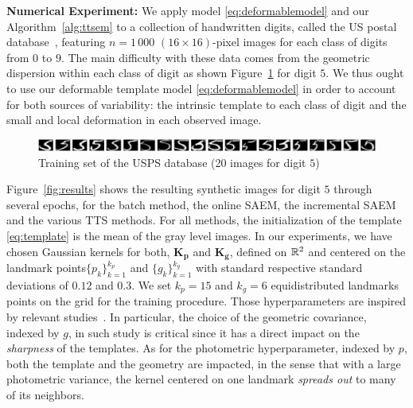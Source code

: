 \documentclass[11pt]{article}
\theoremstyle{t}
\begin{document}
\textbf{Numerical Experiment:} We apply model \eqref{eq:deformablemodel} and our Algorithm~\ref{alg:ttsem} to a collection of handwritten digits, called the US postal database~\citep{hull1994database}, featuring $n = 1\, 000$ $(16 \times 16)$-pixel images for each class of digits from $0$ to $9$.
The main difficulty with these data comes from the geometric dispersion within each class of digit as shown Figure~\ref{fig:variancedigit} for digit $5$.
We thus ought to use our deformable template model \eqref{eq:deformablemodel} in order to account for both sources of variability: the intrinsic template to each class of digit and the small and local deformation in each observed image.
\begin{figure}[H]
\includegraphics[width=\textwidth]{pic_paper/variancedigit.png}\vspace{-.2cm}
\caption{Training set of the USPS database (20 images for digit $5$)}\vspace{-.2cm}
\label{fig:variancedigit}
\end{figure}\vspace{-0.2cm}

Figure~\ref{fig:results} shows the resulting synthetic images for digit $5$ through several epochs, for the batch method, the online SAEM, the incremental SAEM and the various TTS methods.
For all methods, the initialization of the template \eqref{eq:template} is the mean of the gray level images.
In our experiments, we have chosen Gaussian kernels for both, $\mathbf{K}_{\mathbf{p}}$ and $\mathbf{K}_{\mathbf{g}}$, defined on $\rset^2$ and centered on the landmark points$\{p_k\}_{k=1}^{k_p}$ and $\{g_k\}_{k=1}^{k_g}$ with standard respective standard deviations of $0.12$ and $0.3$. 
We set $k_p = 15$  and  $k_g = 6$ equidistributed landmarks points on the grid for the training procedure. 
Those hyperparameters are inspired by relevant studies~\citep{allassonniere2008stochastic,allassonniere2010construction}.
In particular, the choice of the geometric covariance, indexed by $g$, in such study is critical since it has a direct impact on the \emph{sharpness} of the templates.
As for the photometric hyperparameter, indexed by $p$, both the template and the geometry are impacted, in the sense that with a large photometric variance, the kernel centered on one landmark \emph{spreads out} to many of its neighbors.
\end{document}
